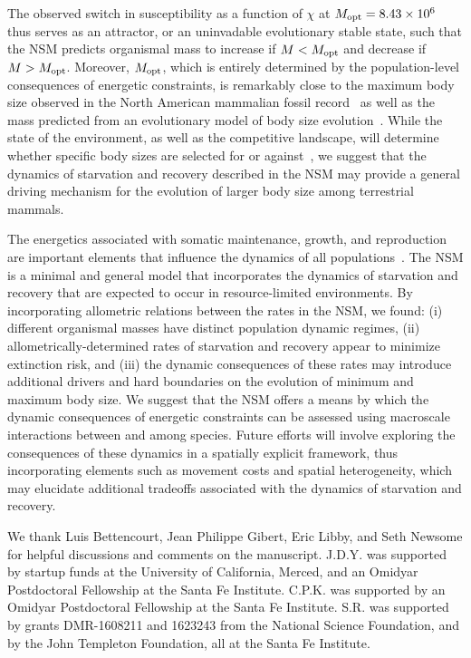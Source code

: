 \documentclass[twocolumn,preprintnumbers,amsmath,amssymb,superscriptaddress]{revtex4}
\begin{document}
The observed switch in susceptibility as a function of $\chi$ at
$M_{\rm opt}=8.43 \times 10^6$ thus serves as an attractor, or an uninvadable
evolutionary stable state, such that the NSM predicts organismal mass to
increase if $M<M_{\rm opt}$ and decrease if $M>M_{\rm opt}$.  Moreover,
$M_{\rm opt}$, which is entirely determined by the population-level
consequences of energetic constraints, is remarkably close to the maximum
body size observed in the North American mammalian fossil
record~\cite{Alroy:1998p1594} as well as the mass predicted from an
evolutionary model of body size evolution~\cite{Clauset:2009fh}.  While the
state of the environment, as well as the competitive landscape, will
determine whether specific body sizes are selected for or
against~\cite{Saarinen:2014br}, we suggest that the dynamics of starvation
and recovery described in the NSM may provide a general driving mechanism for
the evolution of larger body size among terrestrial mammals.


The energetics associated with somatic maintenance, growth, and reproduction
are important elements that influence the dynamics of all
populations~\cite{Stearns:1989ip}.  The NSM is a minimal and general model
that incorporates the dynamics of starvation and recovery that are expected
to occur in resource-limited environments.  By incorporating allometric
relations between the rates in the NSM, we found: (i) different organismal
masses have distinct population dynamic regimes, (ii)
allometrically-determined rates of starvation and recovery appear to minimize
extinction risk, and (iii) the dynamic consequences of these rates may
introduce additional drivers and hard boundaries on the evolution of minimum
and maximum body size.  We suggest that the NSM offers a means by which the
dynamic consequences of energetic constraints can be assessed using
macroscale interactions between and among species.  Future efforts will
involve exploring the consequences of these dynamics in a spatially explicit
framework, thus incorporating elements such as movement costs and spatial
heterogeneity, which may elucidate additional tradeoffs associated with the
dynamics of starvation and recovery.

\vspace{2mm}

 {\small We thank Luis Bettencourt, Jean
  Philippe Gibert, Eric Libby, and Seth Newsome for helpful discussions and
  comments on the manuscript.  J.D.Y. was supported by startup funds at the
  University of California, Merced, and an Omidyar Postdoctoral Fellowship at
  the Santa Fe Institute.  C.P.K. was supported by an Omidyar Postdoctoral
  Fellowship at the Santa Fe Institute.  S.R. was supported by grants
  DMR-1608211 and 1623243 from the National Science Foundation, and by the
  John Templeton Foundation, all at the Santa Fe Institute.  }
\end{document}
